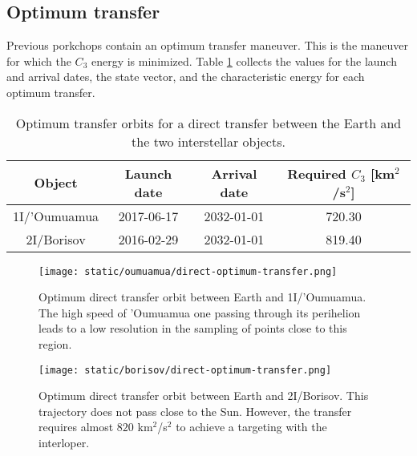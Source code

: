 \subsection{Optimum transfer}

Previous porkchops contain an optimum transfer maneuver. This is the maneuver
for which the $C_3$ energy is minimized. Table \ref{tab:direct-transfer-optimum}
collects the values for the launch and arrival dates, the state vector, and the
characteristic energy for each optimum transfer.

\begin{table}[H]
  \centering
  \begin{tabular}{|c|c|c|c|}
    \hline
    Object & Launch date & Arrival date & Required $C_3$ [km$^2$/s$^2$] \\
    \hline
    1I/'Oumuamua & 2017-06-17 & 2032-01-01 & 720.30 \\
    2I/Borisov & 2016-02-29 & 2032-01-01 & 819.40 \\
    \hline
  \end{tabular}
  \caption{Optimum transfer orbits for a direct transfer between the Earth and the
    two interstellar objects.}
  \label{tab:direct-transfer-optimum}
\end{table}

\begin{figure}[H]
  \centering
  \texttt{[image: static/oumuamua/direct-optimum-transfer.png]}
  \caption{Optimum direct transfer orbit between Earth and 1I/'Oumuamua. The
    high speed of 'Oumuamua one passing through its perihelion leads to a low
    resolution in the sampling of points close to this region.}
  \label{fig:oumuamua-direct-transfer-orbit}
\end{figure}



\begin{figure}[H]
  \centering
  \texttt{[image: static/borisov/direct-optimum-transfer.png]}
  \caption{Optimum direct transfer orbit between Earth and 2I/Borisov. This
        trajectory does not pass close to the Sun. However, the transfer requires almost $820$
        km$^2$/s$^2$ to achieve a targeting with the interloper.}
  \label{fig:borisov-direct-transfer-orbit}
\end{figure}

